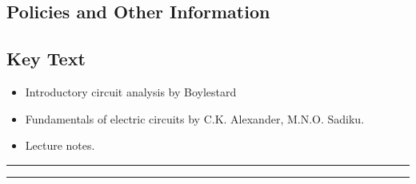 
\subsection*{Policies and Other Information}
\subsection*{Key Text}

\begin{itemize}
    \item Introductory circuit analysis by Boylestard
    \item Fundamentals of electric circuits by C.K. Alexander, M.N.O. Sadiku.
    \item Lecture notes.
\end{itemize}
\vspace{2ex}\hrule
\vspace{2ex}\hrule\vspace{2ex}